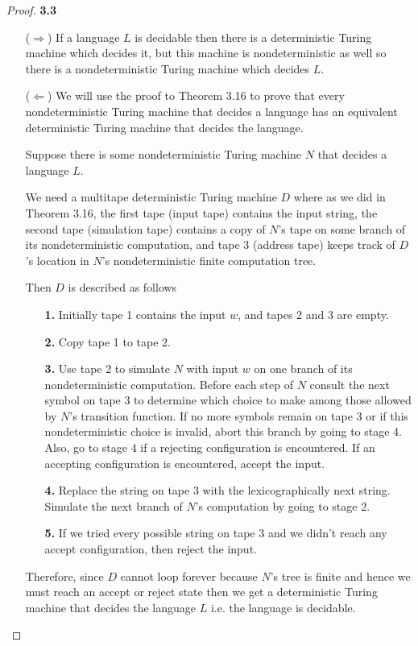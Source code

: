\documentclass[11pt]{article}
\theoremstyle{definition}
\begin{document}
\cleardoublepage
\begin{proof}{\textbf{3.3}}
\begin{itemize}
    \item [($\Rightarrow$)] If a language $L$ is decidable then there is a
    deterministic Turing machine which decides it, but this machine is
    nondeterministic as well so there is a nondeterministic Turing machine
    which decides $L$.

    \item [($\Leftarrow$)]
    We will use the proof to Theorem 3.16 to prove that every nondeterministic
    Turing machine that decides a language has an equivalent deterministic
    Turing machine that decides the language.

    Suppose there is some nondeterministic Turing machine $N$ that decides a
    language $L$.
    
    We need a multitape deterministic Turing machine $D$ where
    as we did in Theorem 3.16, the first tape (input tape) contains the input
    string, the second tape (simulation tape) contains a copy of $N$'s tape on
    some branch of its nondeterministic computation, and tape 3 (address tape)
    keeps track of $D$'s location in $N$'s nondeterministic finite computation
    tree.

    Then $D$ is described as follows
    \begin{itemize}
    \item [\textbf{1.}] Initially tape 1 contains the input $w$, and tapes 2
    and 3 are empty.
    \item [\textbf{2.}] Copy tape 1 to tape 2.
    \item [\textbf{3.}] Use tape 2 to simulate $N$ with input $w$ on one branch
    of its nondeterministic computation.
    Before each step of $N$ consult the next symbol on tape 3 to determine
    which choice to make among those allowed by $N$'s transition function.
    If no more symbols remain on tape 3 or if this nondeterministic choice is
    invalid, abort this branch by going to stage 4.
    Also, go to stage 4 if a rejecting configuration is encountered.
    If an accepting configuration is encountered, accept the input.
    \item [\textbf{4.}] Replace the string on tape 3 with the lexicographically
    next string.
    Simulate the next branch of $N$'s computation by going to stage 2.
    \item [\textbf{5.}] If we tried every possible string on tape 3 and we
    didn't reach any accept configuration, then reject the input.
    \end{itemize}
    Therefore, since $D$ cannot loop forever because $N$'s tree is finite and
    hence we must reach an accept or reject state then we get a deterministic
    Turing machine that decides the language $L$ i.e. the language is
    decidable.
\end{itemize}
\end{proof}
\end{document}
